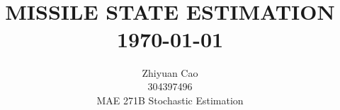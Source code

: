 \title{ \normalsize \textsc{}
	\\ [2.0cm]
	\HRule{0.5pt} \\
	\LARGE \textbf{\uppercase{Missile State Estimation}}
	\HRule{2pt} \\ [0.5cm]
	\normalsize \today \vspace*{5\baselineskip}}

\date{}

\author{
	Zhiyuan Cao\\
	 304397496 \\ 
	MAE 271B Stochastic Estimation \\
 }

\maketitle
\newpage
\tableofcontents
\newpage